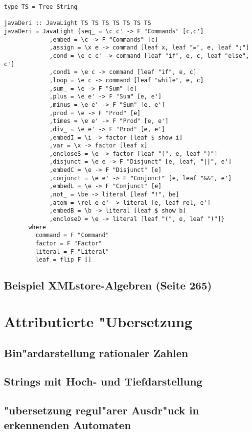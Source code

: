\documentclass[11pt]{article}
\begin{document}
\begin{verbatim}
type TS = Tree String

javaDeri :: JavaLight TS TS TS TS TS TS TS
javaDeri = JavaLight {seq_ = \c c' -> F "Commands" [c,c']
		     ,embed = \c -> F "Commands" [c]
		     ,assign = \x e -> command [leaf x, leaf "=", e, leaf ";"]
		     ,cond = \e c c' -> command [leaf "if", e, c, leaf "else", c']
		     ,cond1 = \e c -> command [leaf "if", e, c]
		     ,loop = \e c -> command [leaf "while", e, c]
		     ,sum_ = \e -> F "Sum" [e]
		     ,plus = \e e' -> F "Sum" [e, e']
		     ,minus = \e e' -> F "Sum" [e, e']
		     ,prod = \e -> F "Prod" [e]
		     ,times = \e e' -> F "Prod" [e, e']
		     ,div_ = \e e' -> F "Prod" [e, e']
		     ,embedI = \i -> factor [leaf $ show i]
		     ,var = \x -> factor [leaf x]
		     ,encloseS = \e -> factor [leaf "(", e, leaf ")"]
		     ,disjunct = \e e -> F "Disjunct" [e, leaf, "||", e']
		     ,embedC = \e -> F "Disjunct" [e]
		     ,conjunct = \e e' -> F "Conjunct" [e, leaf "&&", e']
		     ,embedL = \e -> F "Conjunct" [e]
		     ,not_ = \be -> literal [leaf "!", be]
		     ,atom = \rel e e' -> literal [e, leaf rel, e']
		     ,embedB = \b -> literal [leaf $ show b]
		     ,encloseD = \e -> literal [leaf "(", e, leaf ")"]}
	   where
	     command = F "Command"
	     factor = F "Factor"
	     literal = F "Literal"
	     leaf = flip F []
\end{verbatim}

\subsection{Beispiel XMLstore-Algebren (Seite 265)}
\label{sec-11-6}

\section{Attributierte "Ubersetzung}
\label{sec-12}
\subsection{Bin"ardarstellung rationaler Zahlen}
\label{sec-12-1}
\subsection{Strings mit Hoch- und Tiefdarstellung}
\label{sec-12-2}
\subsection{"ubersetzung regul"arer Ausdr"uck in erkennenden Automaten}
\label{sec-12-3}
\end{document}
